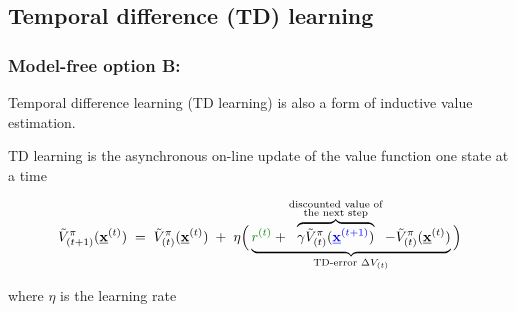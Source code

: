 \subsection{Temporal difference (TD) learning}

\begin{frame}\frametitle{Model-free option B:~\subsecname}

Temporal difference learning (TD learning) is also a form of inductive value estimation.


\pause 

\vspace{2mm}

TD learning is the asynchronous on-line update of the value function one state at a time
	\svspace{-7mm}
	
	\begin{equation}
		\tilde V^{\pi}_{(t+1)}(\vec x^{(t)}) \; = \; 
		\tilde V^{\pi}_{(t)}(\vec x^{(t)}) \;+\;
		\lr \Big( \underbrace{{\color{reward}r^{(t)}} 
		+ \overbrace{
		\gamma \tilde V^{\pi}_{(t)}({\color{trans}\vec x^{(t+1)}})
		}^{\substack{\text{discounted value of}\\ \text{the next step}}} 
		- \tilde V^{\pi}_{(t)}{(\vec x^{(t)})}}_{\text{TD-error }\Delta V_{(t)}} \Big) 
		\label{eq:tdlearningvalue}
	\end{equation}
	
	\svspace{-5mm}
	where $\eta$ is the learning rate
	
\end{frame}
